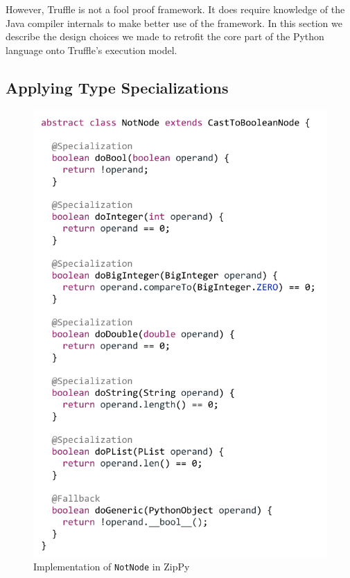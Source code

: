However, Truffle is not a fool proof framework.
It does require knowledge of the Java compiler internals to make better use of the framework.
In this section we describe the design choices we made to retrofit the core part of the Python language onto Truffle's execution model.

\subsection{Applying Type Specializations}

\begin{figure}[t]
\centering
\includegraphics[scale=.9]{figures/ch3-not-node-code.pdf}
\caption{Implementation of \texttt{NotNode} in ZipPy}
\label{fig:not-node-code}
\end{figure}

